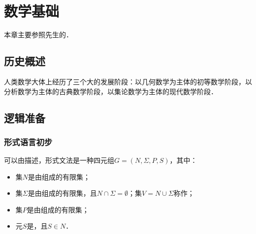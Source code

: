 \chapter{数学基础}

本章主要参照\citeauthor{WangFt2001}先生的\cite{WangFt2001}．

\section{历史概述}

人类数学大体上经历了三个大的发展阶段：以几何数学为主体的初等数学阶段，以分析数学为主体的古典数学阶段，以集论数学为主体的现代数学阶段．

\section{逻辑准备}

\subsection{形式语言初步}

可以由描述，形式文法是一种四元组$G=(N,\Sigma,P,S)$，其中：
\begin{itemize}
    \item 集$N$是由组成的有限集；
    \item 集$\Sigma$是由组成的有限集，且$N\cap\Sigma=\emptyset$；集$V=N\cup\Sigma$称作；
    \item 集$P$是由组成的有限集；
    \item 元$S$是，且$S\in{}N$．
\end{itemize}


